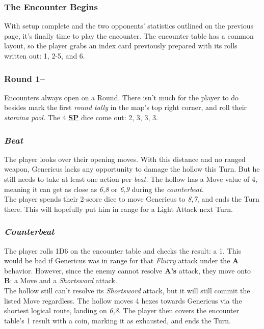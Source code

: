 \documentclass[12pt]{article}
\newcommand{\refto}[1]{\hyperlink{#1}{\textbf{#1}}}
\begin{document}
\begin{multicols*}{2}
\subsubsection*{The Encounter Begins}
With setup complete and the two opponents’ statistics outlined on the previous page, it’s finally time to play the encounter. The encounter table has a common layout, so the player grabs an index card previously prepared with its rolls written out: 1, 2-5, and 6.
\subsubsection*{Round 1--}
Encounters always open on a Round. There isn’t much for the player to do besides mark the first \emph{round tally} in the map’s top right corner, and roll their \emph{stamina pool.} The 4 \refto{SP} dice come out: 2, 3, 3, 3.
\subsubsection*{\emph{Beat}}
The player looks over their opening moves. With this distance and no ranged weapon, Genericus lacks any opportunity to damage the hollow this Turn. But he still needs to take at least one action per \emph{beat.} The hollow has a Move value of 4, meaning it can get as close as \emph{6,8} or \emph{6,9} during the \emph{counterbeat.}\\
The player spends their 2-score dice to move Genericus to \emph{8,7}, and ends the Turn there. This will hopefully put him in range for a Light Attack next Turn.
\subsubsection*{\emph{Counterbeat}}
The player rolls 1D6 on the encounter table and checks the result: a 1. This would be bad if Genericus was in range for that \emph{Flurry} attack under the \textbf{A} behavior. However, since the enemy cannot resolve \textbf{A’s} attack, they move onto \textbf{B}: a Move and a \emph{Shortsword} attack.\\
The hollow still can’t resolve its \emph{Shortsword} attack, but it will still commit the listed Move regardless. The hollow moves 4 hexes towards Genericus via the shortest logical route, landing on \emph{6,8}. The player then covers the encounter table’s 1 result with a coin, marking it as exhausted, and ends the Turn.

\end{multicols*}
\end{document}

